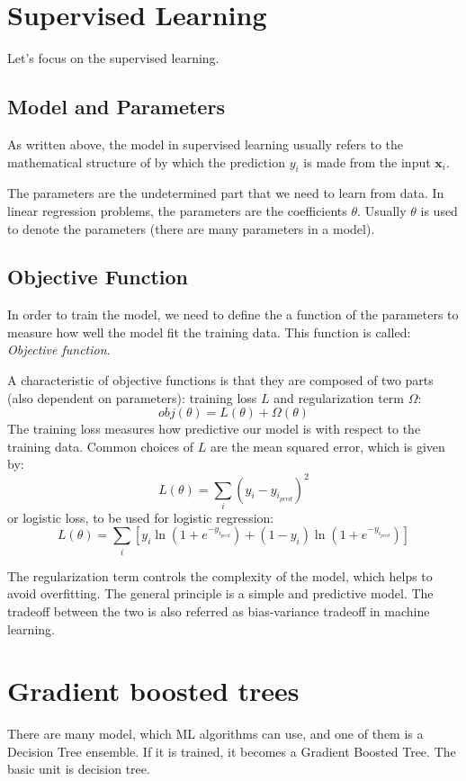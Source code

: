 \documentclass[a4paper, oneside]{book}
\begin{document}
		\section{Supervised Learning}
		Let's focus on the supervised learning. \cite{GBT}
			\subsection{Model and Parameters}
			As written above, the model in supervised learning usually refers to the mathematical structure of by which the prediction $y_i$ is made from the input $\textbf{x}_i$.
		
			The parameters are the undetermined part that we need to learn from data. In linear regression problems, the parameters are the coefficients $\theta$. Usually $\theta$ is used to denote the parameters (there are many parameters in a model).
		
			\subsection{Objective Function}
			In order to train the model, we need to define the a function of the parameters to measure how well the model fit the training data. This function is called: \textit{Objective function}.
			
			A characteristic of objective functions is that they are composed of two parts (also dependent on parameters): training loss $L$ and regularization term $\Omega$:
			$$
			obj(\theta) = L(\theta) + \Omega(\theta)
			$$
			The training loss measures how predictive our model is with respect to the training data. Common choices of $L$ are the mean squared error, which is given by:
			$$
			L(\theta) = \sum_{i}(y_i - y_{i_{pred}})^2
			$$
			or logistic loss, to be used for logistic regression:
			$$
			L(\theta) = \sum_{i}  [{ y_i\ln(1+e^{-y_{i_{pred}}}) + (1-y_i) \ln(1+e^{-y_{i_{pred}}})    }]
			$$
			
			The regularization term controls the complexity of the model, which helps to avoid overfitting. The general principle is a simple and predictive model. The tradeoff between the two is also referred as bias-variance tradeoff in machine learning.
		\section{Gradient boosted trees}
		There are many model, which ML algorithms can use, and one of them is a
		Decision Tree ensemble. If it is trained, it becomes a Gradient Boosted Tree. The basic unit is decision tree.
\end{document}
